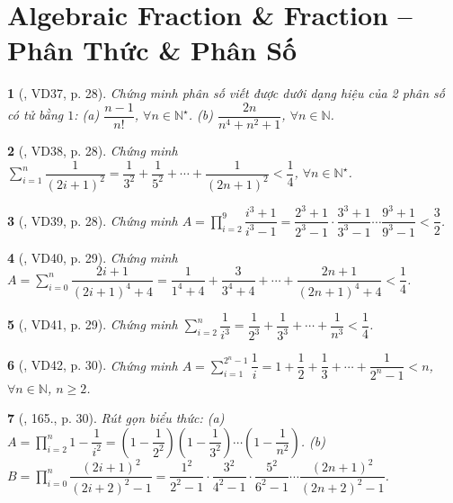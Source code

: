 \documentclass{article}
\newtheorem{baitoan}{}
\begin{document}

\section{Algebraic Fraction \& Fraction -- Phân Thức \& Phân Số}

\begin{baitoan}[\cite{Binh_Toan_8_tap_1}, VD37, p. 28]
	Chứng minh phân số viết được dưới dạng hiệu của 2 phân số có tử bằng $1$: (a) $\dfrac{n - 1}{n!}$, $\forall n\in\mathbb{N}^\star$. (b) $\dfrac{2n}{n^4 + n^2 + 1}$, $\forall n\in\mathbb{N}$.
\end{baitoan}

\begin{baitoan}[\cite{Binh_Toan_8_tap_1}, VD38, p. 28]
	Chứng minh $\sum_{i=1}^n \dfrac{1}{(2i + 1)^2} = \dfrac{1}{3^2} + \dfrac{1}{5^2} + \cdots + \dfrac{1}{(2n + 1)^2} < \dfrac{1}{4}$, $\forall n\in\mathbb{N}^\star$.
\end{baitoan}

\begin{baitoan}[\cite{Binh_Toan_8_tap_1}, VD39, p. 28]
	Chứng minh $A = \prod_{i=2}^9 \dfrac{i^3 + 1}{i^3 - 1} = \dfrac{2^3 + 1}{2^3 - 1}\cdot\dfrac{3^3 + 1}{3^3 - 1}\cdots\dfrac{9^3 + 1}{9^3 - 1} < \dfrac{3}{2}$.
\end{baitoan}

\begin{baitoan}[\cite{Binh_Toan_8_tap_1}, VD40, p. 29]
	Chứng minh $A = \sum_{i=0}^n \dfrac{2i + 1}{(2i + 1)^4 + 4} = \dfrac{1}{1^4 + 4} + \dfrac{3}{3^4 + 4} + \cdots + \dfrac{2n + 1}{(2n + 1)^4 + 4} < \dfrac{1}{4}$.
\end{baitoan}

\begin{baitoan}[\cite{Binh_Toan_8_tap_1}, VD41, p. 29]
	Chứng minh $\sum_{i=2}^n \dfrac{1}{i^3} = \dfrac{1}{2^3} + \dfrac{1}{3^3} + \cdots + \dfrac{1}{n^3} < \dfrac{1}{4}$.
\end{baitoan}

\begin{baitoan}[\cite{Binh_Toan_8_tap_1}, VD42, p. 30]
	Chứng minh $A = \sum_{i=1}^{2^n - 1} \dfrac{1}{i} = 1 + \dfrac{1}{2} + \dfrac{1}{3} + \cdots + \dfrac{1}{2^n - 1} < n$, $\forall n\in\mathbb{N}$, $n\ge2$.
\end{baitoan}

\begin{baitoan}[\cite{Binh_Toan_8_tap_1}, 165., p. 30]
	Rút gọn biểu thức: (a) $A = \prod_{i=2}^n 1 - \dfrac{1}{i^2} = \left(1 - \dfrac{1}{2^2}\right)\left(1 - \dfrac{1}{3^2}\right)\cdots\left(1 - \dfrac{1}{n^2}\right)$. (b) $B = \prod_{i=0}^n \dfrac{(2i + 1)^2}{(2i + 2)^2 - 1} = \dfrac{1^2}{2^2 - 1}\cdot\dfrac{3^2}{4^2 - 1}\cdot\dfrac{5^2}{6^2 - 1}\cdots\dfrac{(2n + 1)^2}{(2n + 2)^2 - 1}$.
\end{baitoan}
\end{document}
